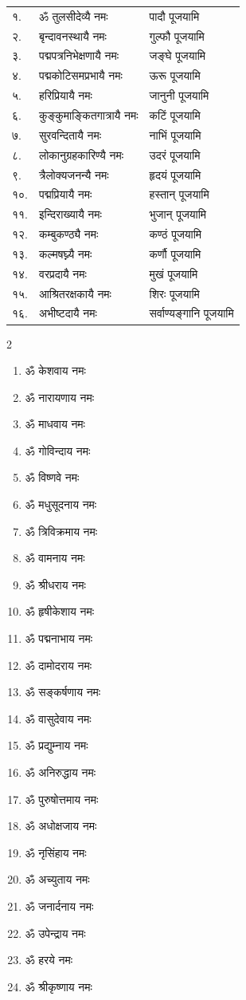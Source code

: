 \begin{longtable}{ll@{— }l}
१.& ॐ तुलसीदेव्यै नमः & पादौ पूजयामि\\
२.& बृन्दावनस्थायै नमः & गुल्फौ पूजयामि\\
३.& पद्मपत्रनिभेक्षणायै नमः & जङ्घे पूजयामि\\
४.& पद्मकोटिसमप्रभायै नमः & ऊरू पूजयामि\\
५.& हरिप्रियायै नमः & जानुनी पूजयामि\\
६.& कुङ्कुमाङ्कितगात्रायै नमः & कटिं पूजयामि\\
७.& सुरवन्दितायै नमः & नाभिं पूजयामि\\
८.& लोकानुग्रहकारिण्यै नमः & उदरं पूजयामि\\
९.& त्रैलोक्यजनन्यै नमः & हृदयं पूजयामि\\
१०.& पद्मप्रियायै नमः & हस्तान् पूजयामि\\
११.& इन्दिराख्यायै नमः & भुजान् पूजयामि\\
१२.& कम्बुकण्ठ्यै नमः & कण्ठं पूजयामि\\
१३.& कल्मषघ्न्यै नमः & कर्णौ पूजयामि\\
१४.& वरप्रदायै नमः & मुखं पूजयामि\\
१५.& आश्रितरक्षकायै नमः & शिरः पूजयामि\\
१६.& अभीष्टदायै नमः & सर्वाण्यङ्गानि पूजयामि\\
\end{longtable}

\begin{multicols}{2}
\begin{enumerate}
\item ॐ केशवाय नमः
\item ॐ नारायणाय नमः
\item ॐ माधवाय नमः
\item ॐ गोविन्दाय नमः
\item ॐ विष्णवे नमः
\item ॐ मधुसूदनाय नमः
\item ॐ त्रिविक्रमाय नमः
\item ॐ वामनाय नमः
\item ॐ श्रीधराय नमः
\item ॐ हृषीकेशाय नमः
\item ॐ पद्मनाभाय नमः
\item ॐ दामोदराय नमः
\item ॐ सङ्कर्षणाय नमः
\item ॐ वासुदेवाय नमः
\item ॐ प्रद्युम्नाय नमः
\item ॐ अनिरुद्धाय नमः
\item ॐ पुरुषोत्तमाय नमः
\item ॐ अधोक्षजाय नमः
\item ॐ नृसिंहाय नमः
\item ॐ अच्युताय नमः
\item ॐ जनार्दनाय नमः
\item ॐ उपेन्द्राय नमः
\item ॐ हरये नमः
\item ॐ श्रीकृष्णाय नमः
\end{enumerate}
\end{multicols}


